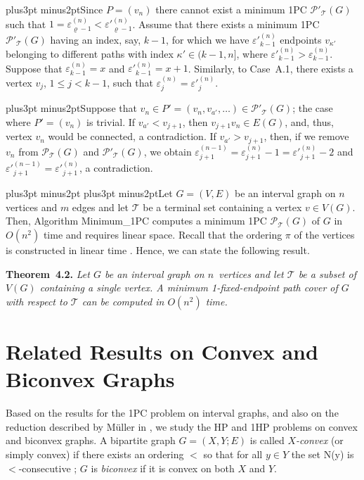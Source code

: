 \documentclass[10pt]{article}
\def\yskip{\penalty-50\vskip3pt plus3pt minus2pt}
\def\y{\yskip}
\def\yy{\yskip\yskip}
\def\qed{\hskip 3pt\vrule height 6pt width 3pt depth 0pt}
\def\s{\ }
\begin{document}
{\y Since $P=(v_n)$ there cannot exist a minimum 1PC
$\mathcal{P'_{\mathcal{T}}}(G)$ such that $1=
\varepsilon^{(n)}_{\varrho-1} < \varepsilon'^{(n)}_{\varrho-1}$.
Assume that there exists a minimum 1PC
$\mathcal{P'_{\mathcal{T}}}(G)$ having an index, say, $k-1$, for
which we have $\varepsilon'^{(n)}_{k-1}$ endpoints $v_{\kappa'}$
belonging to different paths with index $\kappa' \in (k-1,n]$,
where $\varepsilon'^{(n)}_{k-1}>\varepsilon^{(n)}_{k-1}$. Suppose
that $\varepsilon^{(n)}_{k-1}=x$ and $\varepsilon'^{(n)}_{k-1} =
x+1$. Similarly, to Case~A.1, there exists a vertex $v_j$, $1 \leq
j < k-1$, such that $\varepsilon^{(n)}_j = \varepsilon'^{(n)}_j$.

\y Suppose that $v_n \in P'=(v_n, v_{a'}, \ldots) \in
\mathcal{P'_{\mathcal{T}}}(G)$; the case where $P'=(v_n)$ is
trivial. If $v_{a'}<v_{j+1}$, then $v_{j+1}v_n \in E(G)$, and,
thus, vertex $v_n$ would be connected, a contradiction. If
$v_{a'}>v_{j+1}$, then, if we remove $v_n$ from
$\mathcal{P_{\mathcal{T}}}(G)$ and
$\mathcal{P'_{\mathcal{T}}}(G)$, we obtain
$\varepsilon^{(n-1)}_{j+1}=\varepsilon^{(n)}_{j+1}-1=\varepsilon'^{(n)}_{j+1}-2$
and $\varepsilon'^{(n-1)}_{j+1}=\varepsilon'^{(n)}_{j+1}$, a
contradiction. \s \qed

\yy Let $G=(V,E)$ be an interval graph on $n$ vertices and $m$
edges and let $\mathcal{T}$ be a terminal set containing a vertex
$v \in V(G)$. Then, Algorithm Minimum\_1PC computes a minimum 1PC
$\mathcal{P}_\mathcal{T}(G)$ of $G$ in $O(n^2)$ time and requires
linear space. Recall that the ordering $\pi$ of the vertices is
constructed in linear time \cite{RamRan}. Hence, we can state the
following result.

\bigskip
\par\noindent
{\bf Theorem~4.2.} {\it Let $G$ be an interval graph on
$n$~vertices and let $\mathcal{T}$ be a subset of $V(G)$
containing a single vertex. A minimum 1-fixed-endpoint path cover
of $G$ with respect to $\mathcal{T}$ can be computed in $O(n^2)$
time.}


\vskip 0.3in \section{Related Results on Convex and Biconvex Graphs}
Based on the results for the 1PC problem on interval graphs, and
also on the reduction described by M\"{u}ller in \cite{Muller}, we
study the HP and 1HP problems on convex and biconvex graphs. A
bipartite graph $G=(X,Y;E)$ is called {\it $X$-convex} (or simply
convex) if there exists an ordering $<$ so that for all $y \in Y$
the set N(y) is $<$-consecutive \cite{Muller}; $G$ is {\it
biconvex} if it is convex on both $X$ and $Y$.

}
\end{document}
